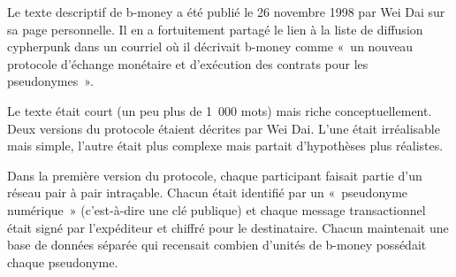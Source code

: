 Le texte descriptif de b-money a été publié le 26 novembre 1998 par Wei Dai sur sa page personnelle. Il en a fortuitement partagé le lien à la liste de diffusion cypherpunk dans un courriel où il décrivait b-money comme «~un nouveau protocole d'échange monétaire et d'exécution des contrats pour les pseudonymes~». %

Le texte était court (un peu plus de 1~000 mots) mais riche conceptuellement. Deux versions du protocole étaient décrites par Wei Dai. L'une était irréalisable mais simple, l'autre était plus complexe mais partait d'hypothèses plus réalistes.

Dans la première version du protocole, chaque participant faisait partie d'un réseau pair à pair intraçable. Chacun était identifié par un «~pseudonyme numérique~» (c'est-à-dire une clé publique) et chaque message transactionnel était signé par l'expéditeur et chiffré pour le destinataire. Chacun maintenait une base de données séparée qui recensait combien d'unités de b-money possédait chaque pseudonyme.

